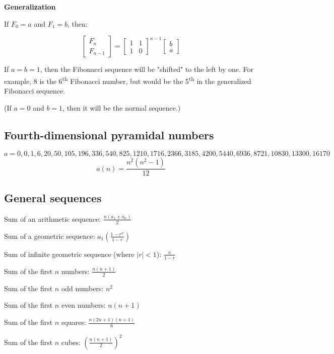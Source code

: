 \textbf{Generalization}

If $F_0 = a$ and $F_1 = b$, then:

\begin{equation*}
    \begin{bmatrix}
        F_n \\
        F_{n-1}
    \end{bmatrix}
    =
    \begin{bmatrix}
        1 & 1 \\
        1 & 0
    \end{bmatrix}
    ^{n-1}
    \begin{bmatrix}
        b \\
        a
    \end{bmatrix}
\end{equation*}

If $a = b = 1$, then the Fibonacci sequence will be "shifted" to the left by one. For example, 8 is the 6\textsuperscript{th} Fibonacci number, but would be the 5\textsuperscript{th} in the generalized Fibonacci sequence.

(If $a = 0$ and $b = 1$, then it will be the normal sequence.)

\subsection*{Fourth-dimensional pyramidal numbers}

$a = {0, 0, 1, 6, 20, 50, 105, 196, 336, 540, 825, 1210, 1716, 2366, 3185, 4200, 5440, 6936, 8721, 10830, 13300, 16170}$
$$a(n) = \frac{n^2(n^2 - 1)}{12}$$

\subsection*{General sequences}

Sum of an arithmetic sequence: $\frac{n(a_1 + a_n)}{2}$

Sum of a geometric sequence: $a_1 ( \frac{1 - r^n}{1 - r} )$

Sum of infinite geometric sequence (where $|r| < 1$): $\frac{a}{1 - r}$

Sum of the first $n$ numbers: $\frac{n(n+1)}{2}$

Sum of the first $n$ odd numbers: $n^2$

Sum of the first $n$ even numbers: $n(n+1)$

Sum of the first $n$ squares: $\frac{n (2n+1) (n+1)}{6}$

Sum of the first $n$ cubes: $( \frac{n(n+1)}{2}) ^2$

